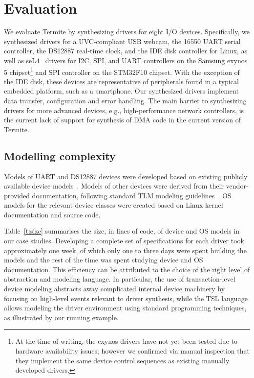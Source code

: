 \documentclass[a4paper,twoside,openright,11pt]{book}
\newcommand{\termite}{Termite\xspace}
\newcommand{\tsl}{TSL\xspace}
\theoremstyle{definition}
\begin{document}
\section{Evaluation}
We evaluate \termite by synthesizing drivers for eight I/O devices.  Specifically, we synthesized drivers for a UVC-compliant USB webcam, the 16550 UART serial controller, the DS12887 real-time clock, and the IDE disk controller for Linux, as well as seL4~\cite{Klein_EHACDEEKNSTW_09} drivers for I2C, SPI, and UART controllers on the Samsung exynos 5 chipset\footnote{At the time of writing, the exynos drivers have not yet been tested due to hardware availability issues; however we confirmed via manual inspection that they implement the same device control sequences as existing manually developed drivers.} and SPI controller on the STM32F10 chipset.  With the exception of the IDE disk, these devices are representative of peripherals found in a typical embedded platform, such as a smartphone.  Our synthesized drivers implement data transfer, configuration and error handling.  The main barrier to synthesizing drivers for more advanced devices, e.g., high-performance network controllers, is the current lack of support for synthesis of DMA code in the current version of \termite.  

\subsection{Modelling complexity} 
Models of UART and DS12887 devices were developed based on existing publicly available device models~\cite{ds12887, uart}.  Models of other devices were derived from their vendor-provided documentation, following standard TLM modeling guidelines~\cite{dml_ug}.  OS models for the relevant device classes were created based on Linux kernel documentation and source code.  

Table~\ref{t:size} summarises the size, in lines of code, of device and OS models in our case studies.  Developing a complete set of specifications for each driver took approximately one week, of which only one to three days were spent building the models and the rest of the time was spent studying device and OS documentation.  This efficiency can be attributed to the choice of the right level of abstraction and modeling language.  In particular, the use of transaction-level device modeling abstracts away complicated internal device machinery by focusing on high-level events relevant to driver synthesis, while the \tsl language allows modeling the driver environment using standard programming techniques, as illustrated by our running example.
\end{document}
